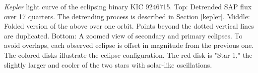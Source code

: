 \label{fig:keplerfig} \emph{Kepler} light curve of the eclipsing binary KIC 9246715. Top: Detrended SAP flux over 17 quarters. The detrending process is described in Section \ref{kepler}. Middle: Folded version of the above over one orbit. Points beyond the dotted vertical lines are duplicated. Bottom: A zoomed view of secondary and primary eclipses. To avoid overlaps, each observed eclipse is offset in magnitude from the previous one. The colored disks illustrate the eclipse configuration. The red disk is "Star 1," the slightly larger and cooler of the two stars with solar-like oscillations.